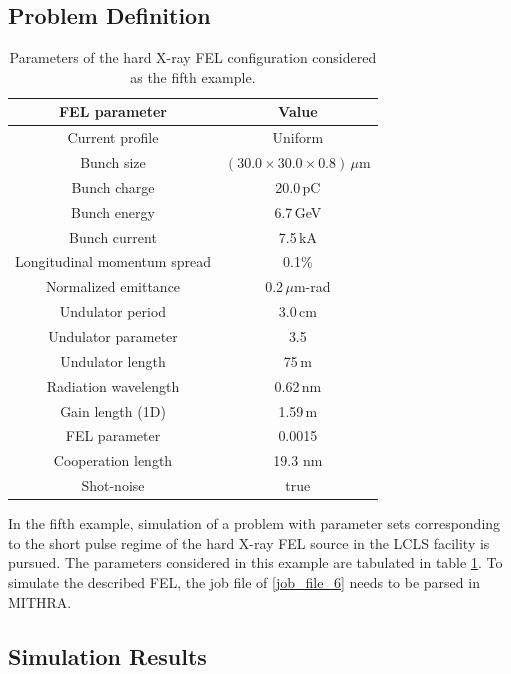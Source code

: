 \subsection{Problem Definition}

\begin{table}
	\label{example5}
	\caption{Parameters of the hard X-ray FEL configuration considered as the fifth example.}
	\centering
	{\footnotesize
	\begin{tabular}{|c||c|}
		\hline
		FEL parameter & Value \\ \hline \hline
		Current profile & Uniform \\ \hline
		Bunch size & $(30.0\times30.0\times0.8)\,\mu$m \\ \hline
		Bunch charge & 20.0\,pC \\ \hline
		Bunch energy & 6.7\,GeV \\	\hline
		Bunch current & 7.5\,kA \\ \hline
		Longitudinal momentum spread & 0.1\% \\ \hline
		Normalized emittance & 0.2\,$\mu$m-rad \\	\hline
		Undulator period & 3.0\,cm \\ \hline
		Undulator parameter & 3.5 \\ \hline
		Undulator length & 75\,m \\ \hline
		Radiation wavelength & 0.62\,nm \\ \hline
		Gain length (1D) & 1.59\,m \\ \hline
		FEL parameter & 0.0015 \\ \hline
		Cooperation length & 19.3 nm \\ \hline
		Shot-noise & true \\ \hline
	\end{tabular}
	}	
\end{table}
%
In the fifth example, simulation of a problem with parameter sets corresponding to the short pulse regime of the hard X-ray FEL source in the LCLS facility is pursued.
%
The parameters considered in this example are tabulated in table \ref{example5}.
%
To simulate the described FEL, the job file of \ref{job_file_6} needs to be parsed in MITHRA.

\subsection{Simulation Results}

